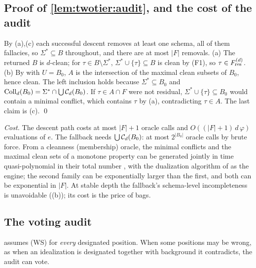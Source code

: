 \subsection{Proof of \texorpdfstring{\cref{lem:twotier:audit}}{the audit lemma}, and the cost of the audit}\label{app:twotier:audit}

By (a),(c) each successful descent removes at least one schema, all of them fallacies, so $\Sigma^*\subseteq B$ throughout, and there are at most $|F|$ removals. (a) The returned $B$ is $d$-clean; for $\tau\in B\setminus\Sigma^*$, $\Sigma^*\cup\{\tau\}\subseteq B$ is clean by (F1), so $\tau\in F^{(d)}_{\mathrm{res}}$. (b) By  with $U=B_0$, $A$ is the intersection of the maximal clean subsets of $B_0$, hence clean. The left inclusion holds because $\Sigma^*\subseteq B_0$ and $\mathrm{Coll}_d(B_0)=\Sigma^*\cap\bigcup\mathcal{C}_d(B_0)$. If $\tau\in A\cap F$ were not residual, $\Sigma^*\cup\{\tau\}\subseteq B_0$ would contain a minimal conflict, which contains $\tau$ by (a), contradicting $\tau\in A$. The last claim is (c). \qed

\emph{Cost.} The descent path costs at most $|F|+1$ oracle calls and $O((|F|+1)\,d\,\varphi)$ evaluations of $e$. The fallback needs $\bigcup\mathcal{C}_d(B_0)$: at most $2^{|B_0|}$ oracle calls by brute force. From a cleanness (membership) oracle, the minimal conflicts and the maximal clean sets of a monotone property can be generated jointly in time quasi-polynomial in their total number \citep{bioch1995complexity,gurvich1999generating}, with the dualization algorithm of \citet{fredman1996complexity} as the engine; the second family can be exponentially larger than the first, and both can be exponential in $|F|$. At stable depth the fallback's schema-level incompleteness is unavoidable ((b)); its cost is the price of bags.

\subsection{The voting audit}\label{app:twotier:voting}

 assumes (WS) for \emph{every} designated position. When some positions may be wrong, as when an idealization is designated together with background it contradicts, the audit can vote.

